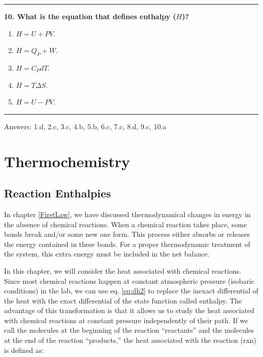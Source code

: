 \documentclass[
  9pt,
]{extbook}
\providecommand{\tightlist}{%
  \setlength{\itemsep}{0pt}\setlength{\parskip}{0pt}}
\theoremstyle{definition}
\theoremstyle{definition}
\theoremstyle{definition}
\theoremstyle{remark}
\begin{document}
\begin{center}\rule{0.5\linewidth}{0.5pt}\end{center}

\textbf{10. What is the equation that defines enthalpy (\(H\))?}

\begin{enumerate}
\def\labelenumi{\alph{enumi}.}
\tightlist
\item
  \(H = U + PV\).
\item
  \(H = Q_P + W\).
\item
  \(H = C_P dT\).
\item
  \(H = T \Delta S\).
\item
  \(H = U - PV\).
\end{enumerate}

\begin{center}\rule{0.5\linewidth}{0.5pt}\end{center}

Answers: 1.d, 2.c, 3.c, 4.b, 5.b, 6.c, 7.c, 8.d, 9.c, 10.a

\newcommand*{\standardstate}{{-\kern-6pt{\ominus}\kern-6pt-}}

\hypertarget{Thermochemistry}{%
\chapter{Thermochemistry}\label{Thermochemistry}}

\hypertarget{rxnenthalpy}{%
\section{Reaction Enthalpies}\label{rxnenthalpy}}

In chapter \ref{FirstLaw}, we have discussed thermodynamical changes in energy in the absence of chemical reactions. When a chemical reaction takes place, some bonds break and/or some new one form. This process either absorbs or releases the energy contained in these bonds. For a proper thermodynamic treatment of the system, this extra energy must be included in the net balance.

In this chapter, we will consider the heat associated with chemical reactions. Since most chemical reactions happen at constant atmospheric pressure (isobaric conditions) in the lab, we can use eq. \eqref{eq:dh2} to replace the inexact differential of the heat with the exact differential of the state function called enthalpy. The advantage of this transformation is that it allows us to study the heat associated with chemical reactions at constant pressure independently of their path. If we call the molecules at the beginning of the reaction ``reactants'' and the molecules at the end of the reaction ``products,'' the heat associated with the reaction (rxn) is defined as:
\end{document}
